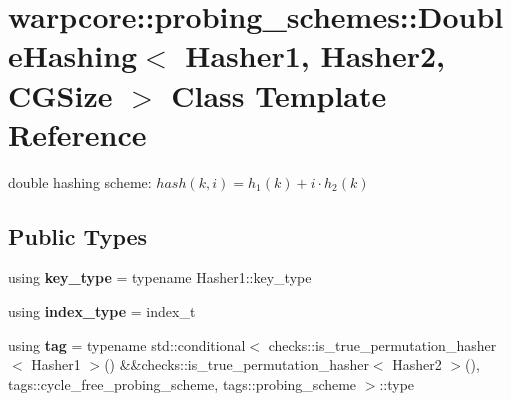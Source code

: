 \hypertarget{classwarpcore_1_1probing__schemes_1_1DoubleHashing}{}\section{warpcore\+:\+:probing\+\_\+schemes\+:\+:Double\+Hashing$<$ Hasher1, Hasher2, C\+G\+Size $>$ Class Template Reference}
\label{classwarpcore_1_1probing__schemes_1_1DoubleHashing}


double hashing scheme\+: $hash(k,i) = h_1(k)+i\cdot h_2(k)$  


\subsection*{Public Types}
\begin{DoxyCompactItemize}
\item 
\mbox{\label{classwarpcore_1_1probing__schemes_1_1DoubleHashing_a7717ccd60167090680b7049a3ea59645}} 
using {\bfseries key\+\_\+type} = typename Hasher1\+::key\+\_\+type
\item 
\mbox{\label{classwarpcore_1_1probing__schemes_1_1DoubleHashing_a806df26c5d213788a298771b746788a5}} 
using {\bfseries index\+\_\+type} = index\+\_\+t
\item 
\mbox{\label{classwarpcore_1_1probing__schemes_1_1DoubleHashing_af11ec5617e5c6ec113991c90570022c8}} 
using {\bfseries tag} = typename std\+::conditional$<$ checks\+::is\+\_\+true\+\_\+permutation\+\_\+hasher$<$ Hasher1 $>$() \&\&checks\+::is\+\_\+true\+\_\+permutation\+\_\+hasher$<$ Hasher2 $>$(), tags\+::cycle\+\_\+free\+\_\+probing\+\_\+scheme, tags\+::probing\+\_\+scheme $>$\+::type
\end{DoxyCompactItemize}
